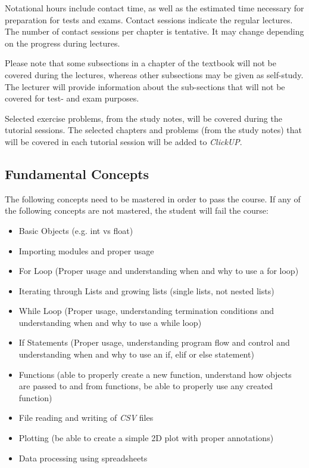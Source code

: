         Notational hours include contact time, as well as the estimated time
        necessary for preparation for tests and exams. Contact sessions indicate
        the regular lectures. The number of contact sessions per chapter is
        tentative. It may change depending on the progress during lectures.

        Please note that some subsections in a chapter of the textbook will not be
        covered during the lectures, whereas other subsections may be given as
        self-study. The lecturer will provide information about the sub-sections
        that will not be covered for test- and exam purposes.

        Selected exercise problems, from the study notes, will be covered during
        the tutorial sessions. The selected chapters and problems (from the study
        notes) that will be covered in each tutorial session will be added to
        {\it ClickUP}.

    \subsection{Fundamental Concepts}
        The following concepts need to be mastered in order to pass the course.
        If any of the following concepts are not mastered, the student will
        fail the course:
        \begin{itemize}
            \item Basic Objects (e.g. int vs float)
            \item Importing modules and proper usage
            \item For Loop (Proper usage and understanding when and why to use
                a for loop)
            \item Iterating through Lists and growing lists (single lists, not
                nested lists)
            \item While Loop (Proper usage, understanding termination
                conditions and understanding when and why to use a while loop)
            \item If Statements (Proper usage, understanding program flow and
                control and understanding when and why to use an if, elif or
                else statement)
            \item Functions (able to properly create a new function, understand
                how objects are passed to and from functions, be able to
                properly use any created function)
            \item File reading and writing of {\it CSV} files
            \item Plotting (be able to create a simple 2D plot with proper
                annotations)
            \item Data processing using spreadsheets
        \end{itemize}

